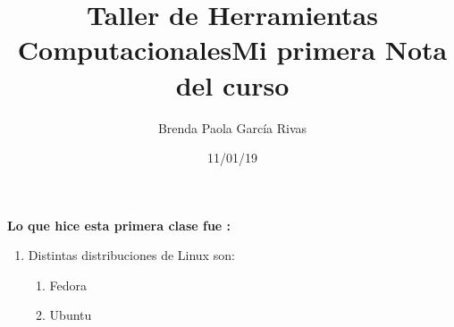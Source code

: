 \documentclass[letterpaper, 12pt, oneside]{article}%
\title{\Huge Taller de Herramientas Computacionales}
\author{Brenda Paola García Rivas}
\date{11/01/19}
\begin{document}
	\maketitle
	\newpage
	
	\title{\Huge Mi primera Nota del curso\\}
	
	\textbf{Lo que hice esta primera clase fue :}
	
	\begin{enumerate}
		\item Distintas distribuciones de Linux son:
		\begin{enumerate}
			\item Fedora
			\item Ubuntu
		\end{enumerate}
		
	\end{enumerate}
\end{document}
